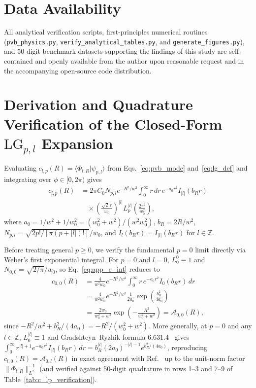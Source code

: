 \documentclass[aps,pra,reprint,nofootinbib,floatfix,longbibliography]{revtex4-2}
\theoremstyle{remark}
\newcommand{\braket}[2]{\langle #1 | #2 \rangle}
\newcommand{\norm}[1]{\lVert #1 \rVert}
\newcommand{\abs}[1]{\lvert #1 \rvert}
\begin{document}
\section*{Data Availability}
All analytical verification scripts, first-principles numerical routines (\texttt{pvb\_\allowbreak physics.py}, \texttt{verify\_\allowbreak analytical\_\allowbreak tables.py}, and \texttt{generate\_\allowbreak figures.py}), and 50-digit benchmark datasets supporting the findings of this study are self-contained and openly available from the author upon reasonable request and in the accompanying open-source code distribution.

\appendix

\section{Derivation and Quadrature Verification of the Closed-Form \texorpdfstring{$\mathrm{LG}_{p,l}$}{LG\_\{p,l\}} Expansion}
\label{app:lg_expansion}

Evaluating $c_{l,p}(R) = \braket{\Phi_{l,R}}{\psi_{p,l}}$ from Eqs.~\eqref{eq:pvb_mode} and~\eqref{eq:lg_def} and integrating over $\phi \in [0,2\pi)$ gives
\begin{align}
c_{l,p}(R) &= 2\pi C_0 N_{p,l} e^{-R^2/w^2} \int_0^\infty r\,dr\, e^{-a_0 r^2} I_{\abs{l}}(b_R r) \nonumber \\
&\quad \times \left(\frac{\sqrt{2}\,r}{w_0}\right)^{\abs{l}} L_p^{\abs{l}}\!\left(\frac{2r^2}{w_0^2}\right),
\label{eq:app_c_int}
\end{align}
where $a_0 = 1/w^2 + 1/w_0^2 = (w_0^2+w^2)/(w^2 w_0^2)$, $b_R = 2R/w^2$, $N_{p,l} = \sqrt{2p!/[\pi(p+\abs{l})!]}/w_0$, and $I_l(b_R r) = I_{\abs{l}}(b_R r)$ for $l \in \mathbb{Z}$.

Before treating general $p \ge 0$, we verify the fundamental $p = 0$ limit directly via Weber's first exponential integral. For $p = 0$ and $l = 0$, $L_0^0 \equiv 1$ and $N_{0,0} = \sqrt{2/\pi}/w_0$, so Eq.~\eqref{eq:app_c_int} reduces to
\begin{align}
c_{0,0}(R) &= \frac{4}{w^2 w_0} e^{-R^2/w^2} \int_0^\infty r\,e^{-a_0 r^2} I_0(b_R r)\,dr \nonumber \\
&= \frac{4}{w^2 w_0} e^{-R^2/w^2} \frac{1}{2a_0} \exp\!\left(\frac{b_R^2}{4a_0}\right) \nonumber \\
&= \frac{2w_0}{w_0^2 + w^2} \exp\!\left(-\frac{R^2}{w_0^2 + w^2}\right) = \mathcal{A}_{0,0}(R),
\label{eq:app_p0_l0_check}
\end{align}
since $-R^2/w^2 + b_R^2/(4a_0) = -R^2/(w_0^2 + w^2)$. More generally, at $p = 0$ and any $l \in \mathbb{Z}$, $L_0^{\abs{l}} \equiv 1$ and Gradshteyn--Ryzhik formula 6.631.4~\cite{Gradshteyn2014} gives $\int_0^\infty r^{\abs{l}+1} e^{-a_0 r^2} I_{\abs{l}}(b_R r)\,dr = b_R^{\abs{l}} (2 a_0)^{-\abs{l}-1} e^{b_R^2/(4a_0)}$, reproducing $c_{l,0}(R) = \mathcal{A}_{0,l}(R)$ in exact agreement with Ref.~\cite{Ferreira2026} up to the unit-norm factor $\norm{\Phi_{l,R}}_{L^2}^{-1}$ (and verified against 50-digit quadrature in rows 1--3 and 7--9 of Table~\ref{tab:c_lp_verification}).
\end{document}
